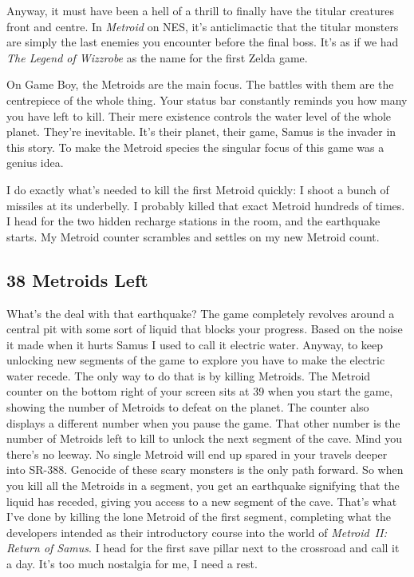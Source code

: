 \documentclass{book}
\begin{document}
Anyway, it must have been a hell of a thrill to finally have the titular creatures front and centre. In \emph{Metroid} on NES, it’s anticlimactic that the titular monsters are simply the last enemies you encounter before the final boss. It’s as if we had \emph{The Legend of Wizzrobe} as the name for the first Zelda game.

On Game Boy, the Metroids are the main focus. The battles with them are the centrepiece of the whole thing. Your status bar constantly reminds you how many you have left to kill. Their mere existence controls the water level of the whole planet. They’re inevitable. It’s their planet, their game, Samus is the invader in this story. To make the Metroid species the singular focus of this game was a genius idea.

I do exactly what’s needed to kill the first Metroid quickly: I shoot a bunch of missiles at its underbelly. I probably killed that exact Metroid hundreds of times. I head for the two hidden recharge stations in the room, and the earthquake starts. My Metroid counter scrambles and settles on my new Metroid count.

\subsection*{38 Metroids Left}\nopagebreak[4]

What’s the deal with that earthquake? The game completely revolves around a central pit with some sort of liquid that blocks your progress. Based on the noise it made when it hurts Samus I used to call it electric water. Anyway, to keep unlocking new segments of the game to explore you have to make the electric water recede. The only way to do that is by killing Metroids. The Metroid counter on the bottom right of your screen sits at 39 when you start the game, showing the number of Metroids to defeat on the planet. The counter also displays a different number when you pause the game. That other number is the number of Metroids left to kill to unlock the next segment of the cave. Mind you there’s no leeway. No single Metroid will end up spared in your travels deeper into SR-388. Genocide of these scary monsters is the only path forward. So when you kill all the Metroids in a segment, you get an earthquake signifying that the liquid has receded, giving you access to a new segment of the cave. That’s what I’ve done by killing the lone Metroid of the first segment, completing what the developers intended as their introductory course into the world of \emph{Metroid II: Return of Samus}. I head for the first save pillar next to the crossroad and call it a day. It’s too much nostalgia for me, I need a rest.
\end{document}
